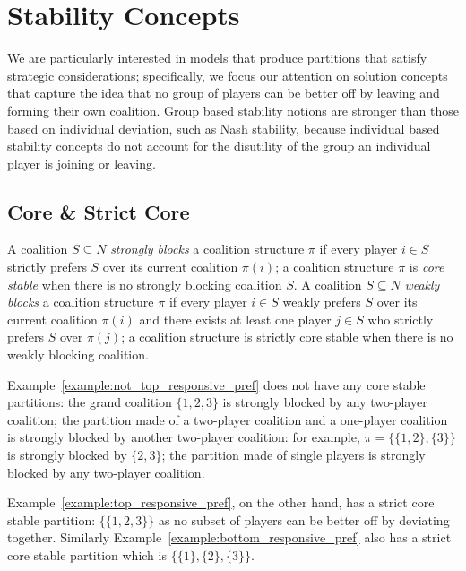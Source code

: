 \section{Stability Concepts}
\label{sec:stability_concepts}
We are particularly interested in models that produce partitions that satisfy
strategic considerations; specifically, we focus our attention on solution
concepts that capture the idea that no group of players can be better off by
leaving and forming their own coalition.
Group based stability notions are stronger than those based on individual deviation,
such as Nash stability, because individual based stability concepts do not account
for the disutility of the group an individual player is joining or leaving.

\subsection{Core \& Strict Core}
\label{subsec:core_strict_core}
A coalition $S \subseteq N$ \textit{strongly blocks} a coalition structure $\pi$
if every player $i \in S$ strictly prefers $S$ over its current coalition $\pi(i)$;
a coalition structure $\pi$ is \textit{core stable} when there is no strongly
blocking coalition $S$.
A coalition $S \subseteq N$ \textit{weakly blocks} a coalition structure $\pi$
if every player $i \in S$ weakly prefers $S$ over its current coalition $\pi(i)$
and there exists at least one player $j \in S$ who strictly prefers $S$
over $\pi(j)$; a coalition structure is strictly core stable when there is no
weakly blocking coalition.

Example~\ref{example:not_top_responsive_pref} does not have any core stable
partitions: the grand coalition $\{1, 2, 3\}$ is strongly blocked by any two-player
coalition; the partition made of a two-player coalition and a one-player
coalition is strongly blocked by another two-player coalition: for example,
$\pi = \{\{1, 2\}, \{3\}\}$ is strongly blocked by $\{2, 3\}$; the partition made
of single players is strongly blocked by any two-player coalition.

Example~\ref{example:top_responsive_pref}, on the other hand, has a strict core
stable partition: $\{\{1, 2, 3\}\}$ as no subset of players can be better off by
deviating together.
Similarly Example~\ref{example:bottom_responsive_pref} also has a strict core
stable partition which is $\{\{1\}, \{2\}, \{3\}\}$.


